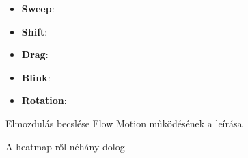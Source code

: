 

\begin{itemize}
\item \textbf{Sweep}: 
\item \textbf{Shift}: 
\item \textbf{Drag}: 
\item \textbf{Blink}: 
\item \textbf{Rotation}: 
\end{itemize}


Elmozdulás becslése
Flow Motion működésének a leírása



A heatmap-ről néhány dolog






